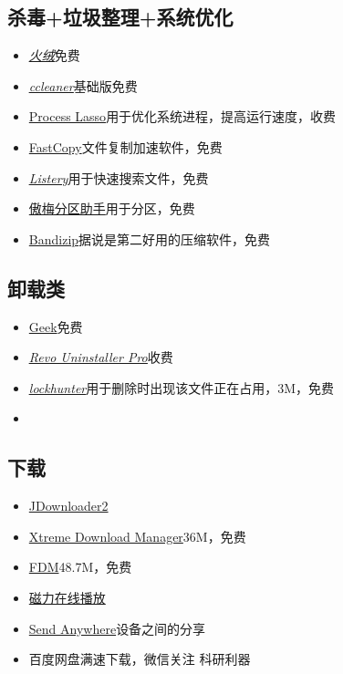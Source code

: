 \documentclass[UTF8,oneside]{ctexbook}
\begin{document}
\subsection{杀毒+垃圾整理+系统优化}
\begin{itemize}
	\item \underline{\textit{\href{https://www.huorong.cn}{火绒}}}\quad 免费
	\item \underline{\textit{\href{http://ccleaner.soft88.com}{ccleaner}}}\quad 基础版免费
	\item \href{https://bitsum.com}{Process Lasso}\quad 用于优化系统进程，提高运行速度，收费
	\item \href{https://fastcopy.jp/en/}{FastCopy}\quad 文件复制加速软件，免费
	\item \underline{\textit{\href{https://www.listary.com}{Listery}}}\quad 用于快速搜索文件，免费
	\item \href{http://www.disktool.cn/download.html}{傲梅分区助手}\quad 用于分区，免费
	\item \href{http://www.bandisoft.com}{Bandizip}\quad 据说是第二好用的压缩软件，免费
\end{itemize}

\subsection{卸载类}
\begin{itemize}
	\item \href{https://geekuninstaller.com}{Geek}\quad 免费
	\item \underline{\textit{\href{https://www.revouninstaller.com/}{Revo Uninstaller Pro}}}\quad 收费
	\item \underline{\textit{\href{https://lockhunter.com}{lockhunter}}}\quad 用于删除时出现该文件正在占用，3M，免费
	\item
\end{itemize}

\subsection{下载}
\begin{itemize}
	\item \href{http://jdownloader.org/jdownloader2}{JDownloader2}
	\item \href{http://xdman.sourceforge.net}{Xtreme Download Manager}\quad 36M，免费
	\item \href{https://www.freedownloadmanager.org/}{FDM}\quad 48.7M，免费
	\item \href{https://webtorrent.io}{磁力在线播放}
	\item \href{https://send-anywhere.com}{Send Anywhere}\quad 设备之间的分享
	\item 百度网盘满速下载，微信关注 科研利器
\end{itemize}
\end{document}

